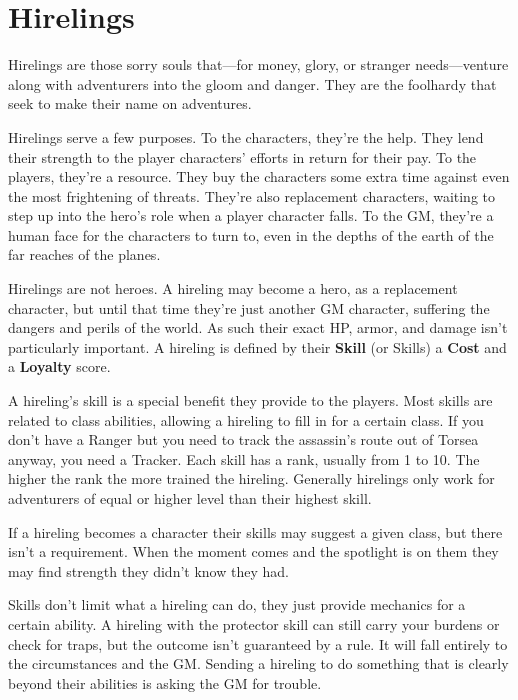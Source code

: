 \chapter{Hirelings}
  
 

Hirelings are those sorry souls that—for money, glory, or stranger needs—venture along with adventurers into the gloom and danger. They are the foolhardy that seek to make their name on adventures.

 

Hirelings serve a few purposes. To the characters, they're the help. They lend their strength to the player characters' efforts in return for their pay. To the players, they're a resource. They buy the characters some extra time against even the most frightening of threats. They're also replacement characters, waiting to step up into the hero's role when a player character falls. To the GM, they're a human face for the characters to turn to, even in the depths of the earth of the far reaches of the planes.

 

Hirelings are not heroes. A hireling may become a hero, as a replacement character, but until that time they're just another GM character, suffering the dangers and perils of the world. As such their exact HP, armor, and damage isn't particularly important. A hireling is defined by their {\bf Skill}  (or Skills) a {\bf Cost}  and a {\bf Loyalty}  score.

 

A hireling's skill is a special benefit they provide to the players. Most skills are related to class abilities, allowing a hireling to fill in for a certain class. If you don't have a Ranger but you need to track the assassin's route out of Torsea anyway, you need a Tracker. Each skill has a rank, usually from 1 to 10. The higher the rank the more trained the hireling. Generally hirelings only work for adventurers of equal or higher level than their highest skill.

 

If a hireling becomes a character their skills may suggest a given class, but there isn't a requirement. When the moment comes and the spotlight is on them they may find strength they didn't know they had.

 

Skills don't limit what a hireling can do, they just provide mechanics for a certain ability. A hireling with the protector skill can still carry your burdens or check for traps, but the outcome isn't guaranteed by a rule. It will fall entirely to the circumstances and the GM. Sending a hireling to do something that is clearly beyond their abilities is asking the GM for trouble.

